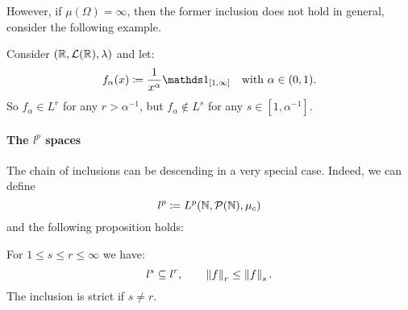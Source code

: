 However, if $\mu(\Omega)=\infty$, then the former inclusion does not hold in general, consider the following example.
\begin{exam}
	Consider $(\mathbb R, \mathcal L(\mathbb R), \lambda)$ and let:
	$$f_\alpha(x) \coloneqq \frac{1}{x^\alpha}\Ind_{[1,\infty]} \quad \text{with } \alpha \in (0,1).$$
	So $f_\alpha \in L^r$ for any $r > \alpha^{-1}$, but $f_\alpha \notin L^s$ for any $s \in [1, \alpha^{-1}].$
\end{exam}

\paragraph{The $l^p$ spaces}  The chain of inclusions can be descending in a very special case. Indeed, we can define 
$$
l^p
\coloneqq L^p(\mathbb N,\mathcal P(\mathbb N),\mu_c)
$$
and the following proposition holds:
\begin{prop}
	For $1 \leq s \leq r \leq \infty$ we have:
	$$ l^s \subseteq l^r, \qquad \left\lVert f\right\rVert_r \leq \left\lVert f\right\rVert_s.$$
	The inclusion is strict if $s \neq r$.
\end{prop}
